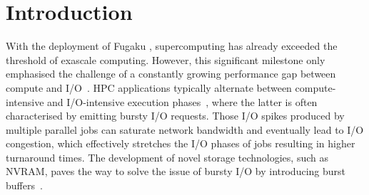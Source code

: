 \documentclass[runningheads]{llncs}
\begin{document}
%
%
%
\section{Introduction}
With the deployment of Fugaku \cite{dongarra2020report}, supercomputing has already exceeded the threshold of exascale computing. However, this significant milestone only emphasised the challenge of a constantly growing performance gap between compute and I/O~\cite{io-bottlenec}. HPC applications typically alternate between compute-intensive and I/O-intensive execution phases~\cite{7161586}, where the latter is often characterised by emitting bursty I/O requests. Those I/O spikes produced by multiple parallel jobs can saturate network bandwidth and eventually lead to I/O congestion, which effectively stretches the I/O phases of jobs resulting in higher turnaround times. The development of novel storage technologies, such as NVRAM, paves the way to solve the issue of bursty I/O by introducing burst buffers~\cite{6232369}.

\end{document}

